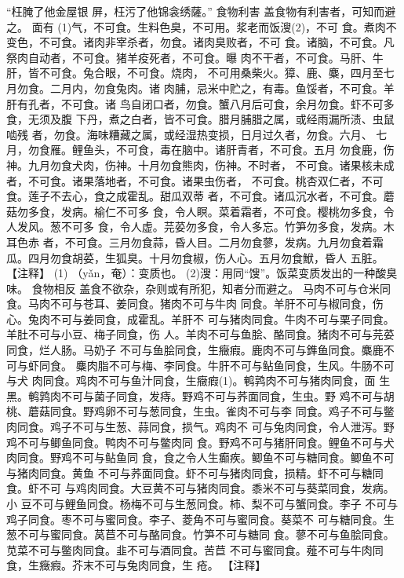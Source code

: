 \documentclass[12pt,UTF8]{ctexbook}
\begin{document}
“枉腌了他金屋银
屏，枉污了他锦衾绣薩。”
食物利害
盖食物有利害者，可知而避之。
面有 (1)气，不可食。生料色臭，不可用。浆老而饭溲(2)，不可
食。煮肉不变色，不可食。诸肉非宰杀者，勿食。诸肉臭败者，不可
食。诸脑，不可食。凡祭肉自动者，不可食。猪羊疫死者，不可食。曝
肉不干者，不可食。马肝、牛肝，皆不可食。兔合眼，不可食。烧肉，
不可用桑柴火。獐、鹿、麋，四月至七月勿食。二月内，勿食兔肉。诸
肉脯，忌米中贮之，有毒。鱼馁者，不可食。羊肝有孔者，不可食。诸
鸟自闭口者，勿食。蟹八月后可食，余月勿食。虾不可多食，无须及腹
下丹，煮之白者，皆不可食。腊月脯腊之属，或经雨漏所渍、虫鼠啮残
者，勿食。海味糟藏之属，或经湿热变损，日月过久者，勿食。六月、
七月，勿食雁。鲤鱼头，不可食，毒在脑中。诸肝青者，不可食。五月
勿食鹿，伤神。九月勿食犬肉，伤神。十月勿食熊肉，伤神。不时者，
不可食。诸果核未成者，不可食。诸果落地者，不可食。诸果虫伤者，
不可食。桃杏双仁者，不可食。莲子不去心，食之成霍乱。甜瓜双蒂
者，不可食。诸瓜沉水者，不可食。蘑菇勿多食，发病。榆仁不可多
食，令人瞑。菜着霜者，不可食。樱桃勿多食，令人发风。葱不可多
食，令人虚。芫荽勿多食，令人多忘。竹笋勿多食，发病。木耳色赤
者，不可食。三月勿食蒜，昏人目。二月勿食蓼，发病。九月勿食着霜
瓜。四月勿食胡荽，生狐臭。十月勿食椒，伤人心。五月勿食鮲，昏人
五脏。
【注释】
(1) （yǎn，奄）：变质也。
(2)溲：用同“馊”。饭菜变质发出的一种酸臭味。
食物相反
盖食不欲杂，杂则或有所犯，知者分而避之。
马肉不可与仓米同食。马肉不可与苍耳、姜同食。猪肉不可与牛肉
同食。羊肝不可与椒同食，伤心。兔肉不可与姜同食，成霍乱。羊肝不
可与猪肉同食。牛肉不可与栗子同食。羊肚不可与小豆、梅子同食，伤
人。羊肉不可与鱼脍、酪同食。猪肉不可与芫荽同食，烂人肠。马奶子
不可与鱼脍同食，生癥瘕。鹿肉不可与鎨鱼同食。麋鹿不可与虾同食。
麋肉脂不可与梅、李同食。牛肝不可与鲇鱼同食，生风。牛肠不可与犬
肉同食。鸡肉不可与鱼汁同食，生癥瘕(1)。鹌鹑肉不可与猪肉同食，面
生黑。鹌鹑肉不可与菌子同食，发痔。野鸡不可与荞面同食，生虫。野
鸡不可与胡桃、蘑菇同食。野鸡卵不可与葱同食，生虫。雀肉不可与李
同食。鸡子不可与鳖肉同食。鸡子不可与生葱、蒜同食，损气。鸡肉不
可与兔肉同食，令人泄泻。野鸡不可与鲫鱼同食。鸭肉不可与鳖肉同
食。野鸡不可与猪肝同食。鲤鱼不可与犬肉同食。野鸡不可与鲇鱼同
食，食之令人生癫疾。鲫鱼不可与糖同食。鲫鱼不可与猪肉同食。黄鱼
不可与荞面同食。虾不可与猪肉同食，损精。虾不可与糖同食。虾不可
与鸡肉同食。大豆黄不可与猪肉同食。黍米不可与葵菜同食，发病。小
豆不可与鲤鱼同食。杨梅不可与生葱同食。柿、梨不可与蟹同食。李子
不可与鸡子同食。枣不可与蜜同食。李子、菱角不可与蜜同食。葵菜不
可与糖同食。生葱不可与蜜同食。莴苣不可与酪同食。竹笋不可与糖同
食。蓼不可与鱼脍同食。苋菜不可与鳖肉同食。韭不可与酒同食。苦苣
不可与蜜同食。薤不可与牛肉同食，生癥瘕。芥末不可与兔肉同食，生
疮。
【注释】
\end{document}
